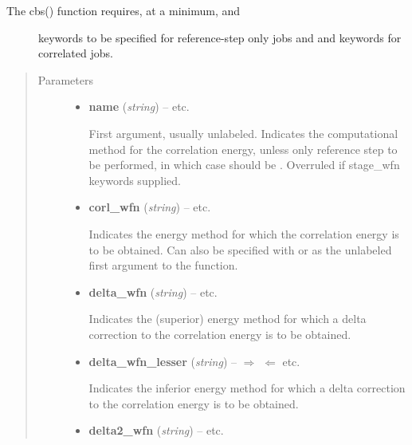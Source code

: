 \documentclass[letterpaper,10pt,english]{sphinxmanual}
\begin{document}
\begin{fulllineitems}
\begin{itemize}
\begin{description}
\end{description}

\end{itemize}
\begin{description}
\item[{The cbs() function requires, at a minimum,  and }] \leavevmode
keywords to be specified for reference-step only jobs and  and
 keywords for correlated jobs.

\end{description}
\begin{quote}\begin{description}
\item[{Parameters}] \leavevmode\begin{itemize}
\item {} 
\textbf{name} (\emph{string}) -- 
 \textbar{}\textbar{}  \textbar{}\textbar{} etc.

First argument, usually unlabeled. Indicates the computational method
for the correlation energy, unless only reference step to be performed,
in which case should be . Overruled if stage\_wfn keywords supplied.


\item {} 
\textbf{corl\_wfn} (\emph{string}) -- 
 \textbar{}\textbar{}  \textbar{}\textbar{} etc.

Indicates the energy method for which the correlation energy is to be
obtained. Can also be specified with  or as the unlabeled
first argument to the function.


\item {} 
\textbf{delta\_wfn} (\emph{string}) -- 
 \textbar{}\textbar{}  \textbar{}\textbar{} etc.

Indicates the (superior) energy method for which a delta correction
to the correlation energy is to be obtained.


\item {} 
\textbf{delta\_wfn\_lesser} (\emph{string}) -- 
$\Rightarrow$  $\Leftarrow$ \textbar{}\textbar{}  \textbar{}\textbar{} etc.

Indicates the inferior energy method for which a delta correction
to the correlation energy is to be obtained.


\item {} 
\textbf{delta2\_wfn} (\emph{string}) -- 
 \textbar{}\textbar{}  \textbar{}\textbar{} etc.


\end{itemize}
\end{description}
\end{quote}
\end{fulllineitems}
\end{document}
